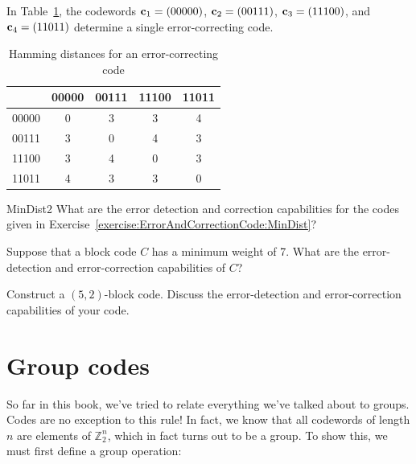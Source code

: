  \begin{example}{}
In Table~\ref{algcodes:table2}, the codewords ${\bold c}_1 = (00000)$, ${\bold c}_2 = (00111)$,
${\bold c}_3 = (11100)$, and ${\bold c}_4 = (11011)$ determine a
single error-correcting code.  
\end{example}
  
\begin{table}[htb]
\caption{ Hamming distances for an error-correcting code\label{algcodes:table2}}{\small
\begin{center}
\begin{tabular}{|c|cccc|}
\hline
      & 00000 & 00111 & 11100 & 11011 \\ \hline
00000 & 0     & 3     & 3     & 4 \\
00111 & 3     & 0     & 4     & 3 \\
11100 & 3     & 4     & 0     & 3 \\
11011 & 4     & 3     & 3     & 0 \\
\hline
\end{tabular}
\end{center}
}
\end{table}
 
 \begin{exercise}{MinDist2}
What are the error detection and correction capabilities for the codes given in Exercise~\ref{exercise:ErrorAndCorrectionCode:MinDist}? 
\end{exercise} 
 
\begin{exercise}{}
Suppose that a  block code $C$ has a minimum weight of 7. What are the
error-detection and error-correction capabilities of $C$?
\end{exercise}
 
 \begin{exercise}{}
Construct a $(5,2)$-block code. Discuss the error-detection and
error-correction capabilities of your code.
 \end{exercise}
 
\section{Group codes\quad
{}}
\label{sec:ErrorAndCorrectionCode:GroupCodes}

So far in this book, we've tried to relate everything we've talked about to groups. Codes are no exception to this rule!  In fact, we know that all codewords of length $n$ are elements of $\mathbb{Z}_2^n$, which in fact turns out to be a group. To show this, we must first define a group operation:

